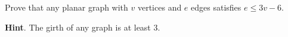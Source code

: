 \documentclass{book}
\begin{document}
\setcounter{cpjt}{30}
\addtocounter{cpjt}{-1}
\begin{activity}\label{activity-25}
\hypertarget{p-291}{}%
Prove that any planar graph with \(v\) vertices and \(e\) edges satisfies \(e \le 3v - 6\).%
\par\smallskip%
\noindent\textbf{Hint}.\hypertarget{hint-9}{}\quad%
\hypertarget{p-292}{}%
The girth of any graph is at least 3.%
\par\smallskip%
\noindent\end{activity}

\clearpage
\end{document}
